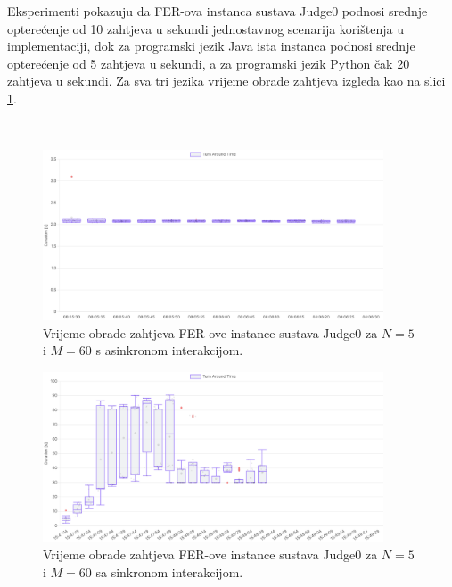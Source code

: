 \documentclass[times, utf8, diplomski]{fer}
\begin{document}
Eksperimenti pokazuju da FER-ova instanca sustava Judge0 podnosi srednje opterećenje od 10 zahtjeva u sekundi jednostavnog scenarija korištenja u  implementaciji, dok za programski jezik Java ista instanca podnosi srednje opterećenje od 5 zahtjeva u sekundi, a za programski jezik Python čak 20 zahtjeva u sekundi. Za sva tri jezika vrijeme obrade zahtjeva izgleda kao na slici \ref{fig:judge0-fer-1}.

\

\begin{figure}[htb]
	\centering
	\includegraphics[width=0.9\textwidth]{images/Judge0 FER TAT for 5 5s.png}
	\caption{
		Vrijeme obrade zahtjeva FER-ove instance sustava Judge0 za $N=5$ i $M=60$ s asinkronom interakcijom.
	}
	\label{fig:judge0-fer-1}
\end{figure}

\begin{figure}[htb]
	\centering
	\includegraphics[width=0.9\textwidth]{images/Judge0 FER TAT for sync 5 5s.png}
	\caption{
		Vrijeme obrade zahtjeva FER-ove instance sustava Judge0 za $N=5$ i $M=60$ sa sinkronom interakcijom.
	}
	\label{fig:judge0-fer-2}
\end{figure}
\end{document}
